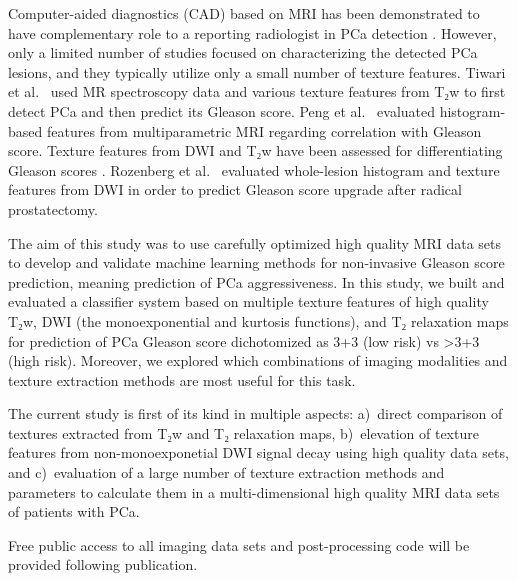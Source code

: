 Computer-aided diagnostics (CAD) based on MRI has been demonstrated to have
complementary role to a reporting radiologist in PCa detection \citep{Kwak2015,
Viswanath2012, Ginsburg2014}. However, only a limited number of studies focused
on characterizing the detected PCa lesions, and they typically utilize only a
small number of texture features. Tiwari et al.\ \cite{Tiwari2013} used MR
spectroscopy data and various texture features from T₂w to first detect PCa and
then predict its Gleason score. Peng et al.\ \cite{Peng2013} evaluated
histogram-based features from multiparametric MRI regarding correlation with
Gleason score. Texture features from DWI and T₂w have been assessed for
differentiating Gleason scores \citep{Wibmer2015, Vignati2015, Fehr2015}.
Rozenberg et al.\ \cite{Rozenberg2016} evaluated whole-lesion histogram and
texture features from DWI in order to predict Gleason score upgrade after
radical prostatectomy.

The aim of this study was to use carefully optimized high quality MRI data sets
to develop and validate machine learning methods for non-invasive Gleason score
prediction, meaning prediction of PCa aggressiveness. In this study, we built
and evaluated a classifier system based on multiple texture features of high
quality T₂w, DWI (the monoexponential and kurtosis functions), and T₂ relaxation
maps for prediction of PCa Gleason score dichotomized as 3+3 (low risk) vs >3+3
(high risk). Moreover, we explored which combinations of imaging modalities and
texture extraction methods are most useful for this task.

The current study is first of its kind in multiple aspects: a)~direct comparison
of textures extracted from T₂w and T₂ relaxation maps, b)~elevation of texture
features from non-monoexponetial DWI signal decay using high quality data sets,
and c)~evaluation of a large number of texture extraction methods and parameters
to calculate them in a multi-dimensional high quality MRI data sets of patients
with PCa.

Free public access to all imaging data sets and post-processing code will be
provided following publication.
